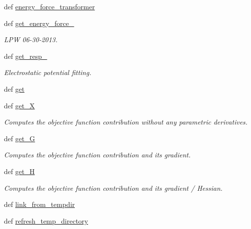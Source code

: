 \begin{DoxyCompactItemize}
\item 
def \hyperlink{classforcebalance_1_1abinitio_1_1AbInitio_a9167da321a9fff748eef5ebe754cc7ca}{energy\-\_\-force\-\_\-transformer}
\item 
def \hyperlink{classforcebalance_1_1abinitio_1_1AbInitio_a313c848f46579817803c8a3ff100974e}{get\-\_\-energy\-\_\-force\-\_\-}
\begin{DoxyCompactList}\small\item\em L\-P\-W 06-\/30-\/2013. \end{DoxyCompactList}\item 
def \hyperlink{classforcebalance_1_1abinitio_1_1AbInitio_abfe50569805218075c5942fd3be8bbe7}{get\-\_\-resp\-\_\-}
\begin{DoxyCompactList}\small\item\em Electrostatic potential fitting. \end{DoxyCompactList}\item 
def \hyperlink{classforcebalance_1_1abinitio_1_1AbInitio_a2bb3ed7209707f688ec8b731392466b5}{get}
\item 
def \hyperlink{classforcebalance_1_1target_1_1Target_a606dd136f195c267c05a2455405e5949}{get\-\_\-\-X}
\begin{DoxyCompactList}\small\item\em Computes the objective function contribution without any parametric derivatives. \end{DoxyCompactList}\item 
def \hyperlink{classforcebalance_1_1target_1_1Target_afa8cc38c8bba8861c072e789717aa049}{get\-\_\-\-G}
\begin{DoxyCompactList}\small\item\em Computes the objective function contribution and its gradient. \end{DoxyCompactList}\item 
def \hyperlink{classforcebalance_1_1target_1_1Target_a1d2ee27fe86a09769c1816af23b09adb}{get\-\_\-\-H}
\begin{DoxyCompactList}\small\item\em Computes the objective function contribution and its gradient / Hessian. \end{DoxyCompactList}\item 
def \hyperlink{classforcebalance_1_1target_1_1Target_a5aa4958cea0a48138511567a076c5a82}{link\-\_\-from\-\_\-tempdir}
\item 
def \hyperlink{classforcebalance_1_1target_1_1Target_afe815eafab06ac92f10bbf4b88ad95c8}{refresh\-\_\-temp\-\_\-directory}

\end{DoxyCompactItemize}
